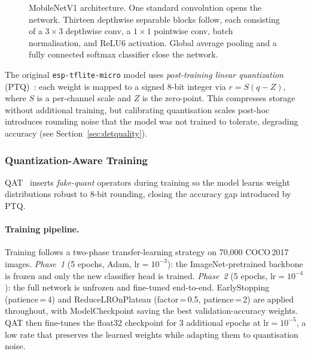 \documentclass[conference]{IEEEtran}
\begin{document}
\begin{figure}[h]
{
}
\caption{MobileNetV1 architecture. One standard convolution opens the
         network. Thirteen depthwise separable blocks follow, each consisting
         of a $3{\times}3$ depthwise conv, a $1{\times}1$ pointwise
         conv, batch normalisation, and ReLU6 activation. Global average
         pooling and a fully connected softmax classifier close the
         network.}
\label{fig:mobilenet}
\end{figure}



The original \texttt{esp-tflite-micro} model uses \emph{post-training
linear quantization} (PTQ)~\cite{tflitemicro}: each weight is mapped to
a signed 8-bit integer via $r = S(q-Z)$, where $S$ is a per-channel
scale and $Z$ is the zero-point. This compresses storage without
additional training, but calibrating quantisation scales post-hoc
introduces rounding noise that the model was not trained to tolerate,
degrading accuracy (see Section~\ref{sec:detquality}).

\subsubsection{Quantization-Aware Training}

QAT~\cite{qat} inserts \emph{fake-quant} operators during training so
the model learns weight distributions robust to 8-bit rounding, closing
the accuracy gap introduced by PTQ.

\paragraph{Training pipeline.}
Training follows a two-phase transfer-learning strategy on 70{,}000
COCO\,2017 images. \emph{Phase~1} (5 epochs, Adam, $\text{lr}=10^{-3}$):
the ImageNet-pretrained backbone is frozen and only the new classifier
head is trained. \emph{Phase~2} (5 epochs, $\text{lr}=10^{-4}$): the
full network is unfrozen and fine-tuned end-to-end.
EarlyStopping (patience\,=\,4) and ReduceLROnPlateau
(factor\,=\,0.5, patience\,=\,2) are applied throughout, with
ModelCheckpoint saving the best validation-accuracy weights.
QAT then fine-tunes the float32 checkpoint for 3 additional epochs at
$\text{lr}=10^{-5}$, a low rate that preserves the learned weights
while adapting them to quantisation noise.
\end{document}
